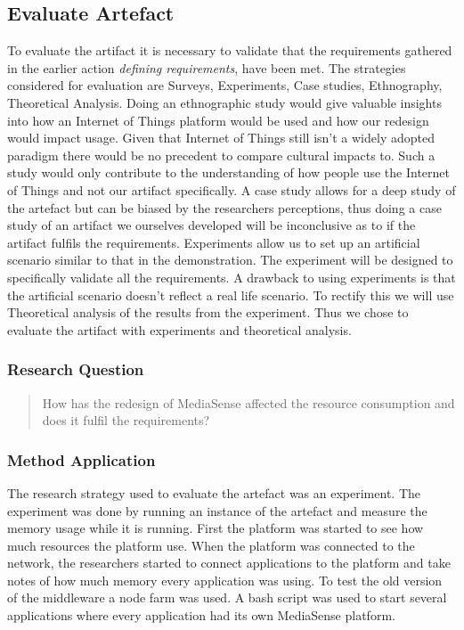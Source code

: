 \subsection{Evaluate Artefact}
To evaluate the artifact it is necessary to validate that the requirements gathered in the earlier action \emph{defining requirements}, have been met. The strategies considered for evaluation are Surveys, Experiments, Case studies, Ethnography, Theoretical Analysis. 
Doing an ethnographic study would give valuable insights into how an Internet of Things platform would be used and how our redesign would impact usage. Given that Internet of Things still isn't a widely adopted paradigm there would be no precedent to compare cultural impacts to. Such a study would only contribute to the understanding of how people use the Internet of Things and not our artifact specifically. A case study allows for a deep study of the artefact but can be biased by the researchers perceptions, thus doing a case study of an artifact we ourselves developed will be inconclusive as to if the artifact fulfils the requirements.
Experiments allow us to set up an artificial scenario similar to that in the demonstration. The experiment will be designed to specifically validate all the requirements. A drawback to using experiments is that the artificial scenario doesn't reflect a real life scenario. To rectify this we will use Theoretical analysis of the results from the experiment. Thus we chose to evaluate the artifact with experiments and theoretical analysis.

\subsubsection{Research Question}
\begin{quotation}
How has the redesign of MediaSense affected the resource consumption and does it fulfil the requirements?
\end{quotation}

\subsubsection{Method Application}
The research strategy used to evaluate the artefact was an experiment. The experiment was done by running an instance of the artefact and measure the memory usage while it is running. First the platform was started to see how much resources the platform use. When the platform was connected to the network, the researchers started to connect applications to the platform and take notes of how much memory every application was using. To test the old version of the middleware a node farm was used. A bash script was used to start several applications where every application had its own MediaSense platform. 

